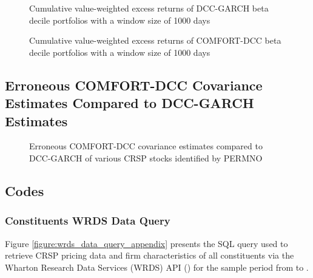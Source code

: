 \documentclass[11pt,a4paper]{article}
\begin{document}
\begin{figure}[H]
	\vspace{-12mm}
	\hspace{-5mm}\vspace{-15mm}
	\caption{Cumulative value-weighted excess returns of DCC-GARCH beta decile portfolios with a window size of 1000 days}
	\label{figure:vw_cum_ret_deciles_DCC-1000_appendix}
\end{figure}

\begin{figure}[H]
	\vspace{-12mm}
	\hspace{-5mm}\vspace{-15mm}
	\caption{Cumulative value-weighted excess returns of COMFORT-DCC beta decile portfolios with a window size of 1000 days}
	\label{figure:vw_cum_ret_deciles_COMFORT-DCC_appendix}
\end{figure}







\subsection{Erroneous COMFORT-DCC Covariance Estimates Compared to DCC-GARCH Estimates} \label{sec:appendix:erroneous_covariances}

\begin{figure}[H]
	\hspace{-5mm}
	\caption{Erroneous COMFORT-DCC covariance estimates compared to DCC-GARCH of various CRSP stocks identified by PERMNO}
	\label{figure:erroneous_covariances_appendix}
\end{figure}





\subsection{Codes}

\subsubsection{\indexName{} Constituents WRDS Data Query} \label{sec:appendix:wrds_query}

Figure \ref{figure:wrds_data_query_appendix} presents the SQL query used to retrieve CRSP pricing data and firm characteristics of all \indexName{} constituents via the Wharton Research Data Services (WRDS) API () for the sample period from \periodFrom{} to \periodTo{}.
\end{document}
